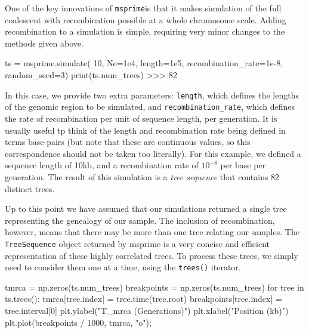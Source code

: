 \documentclass[graybox]{svmult}
\newcommand{\msprime}[0]{\texttt{msprime}}
\newcommand{\includenbimage}[1]{\begin{center}\texttt{[image: \#1]}\end{center}}
\begin{document}
One of the key innovations of \msprime is that it makes simulation of the
full coalescent with recombination possible at a whole chromosome scale.
Adding recombination to a simulation is simple, requiring very minor
changes to the methods given above.

\begin{pythoncode}
ts = msprime.simulate(
    10, Ne=1e4, length=1e5, recombination_rate=1e-8, random_seed=3)
print(ts.num_trees)
>>> 82
\end{pythoncode}

    In this case, we provide two extra parameters: \texttt{length}, which
defines the lengths of the genomic region to be simulated, and
\texttt{recombination\_rate}, which defines the rate of recombination
per unit of sequence length, per generation. It is usually useful tp
think of the length and recombination rate being defined in terms
base-pairs (but note that these are continuous values, so this
correspondence should not be taken too literally). For this example, we
defined a sequence length of 10kb, and a recombination rate of
\(10^{-8}\) per base per generation. The result of this simulation is a
\emph{tree sequence} that contains 82 distinct trees.

Up to this point we have assumed that our simulations returned a single
tree representing the genealogy of our sample. The inclusion of
recombination, however, means that there may be more than one tree
relating our samples. The \texttt{TreeSequence} object returned by
msprime is a very concise and efficient representation of these highly
correlated trees. To process these trees, we simply need to consider
them one at a time, using the \texttt{trees()} iterator.

\begin{pythoncode}
tmrca = np.zeros(ts.num_trees)
breakpoints = np.zeros(ts.num_trees)
for tree in ts.trees():
    tmrca[tree.index] = tree.time(tree.root)
    breakpoints[tree.index] = tree.interval[0]
plt.ylabel("T_mrca (Generations)")
plt.xlabel("Position (kb)")
plt.plot(breakpoints / 1000, tmrca, "o");
\end{pythoncode}

\end{document}
